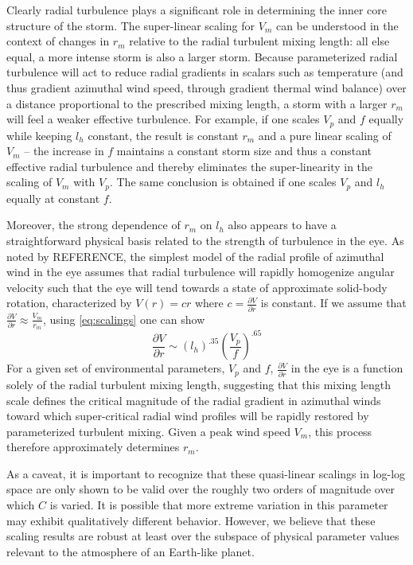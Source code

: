 \documentclass[12pt]{article}
\begin{document}
Clearly radial turbulence plays a significant role in determining the inner core structure of the storm. The super-linear scaling for $V_m$ can be understood in the context of changes in $r_m$ relative to the radial turbulent mixing length: all else equal, a more intense storm is also a larger storm. Because parameterized radial turbulence will act to reduce radial gradients in scalars such as temperature (and thus gradient azimuthal wind speed, through gradient thermal wind balance) over a distance proportional to the prescribed mixing length, a storm with a larger $r_m$ will feel a weaker effective turbulence.  For example, if one scales $V_p$ and $f$ equally while keeping $l_h$ constant, the result is constant $r_m$ and a pure linear scaling of $V_m$ -- the increase in $f$ maintains a constant storm size and thus a constant effective radial turbulence and thereby eliminates the super-linearity in the scaling of $V_m$ with $V_p$.  The same conclusion is obtained if one scales $V_p$ and $l_h$ equally at constant $f$.

Moreover, the strong dependence of $r_m$ on $l_h$ also appears to have a straightforward physical basis related to the strength of turbulence in the eye.  As noted by REFERENCE, the simplest model of the radial profile of azimuthal wind in the eye assumes that radial turbulence will rapidly homogenize angular velocity such that the eye will tend towards a state of approximate solid-body rotation, characterized by $V(r) = cr$ where $c=\frac{\partial V}{\partial r}$ is constant. If we assume that $\frac{\partial V}{\partial r} \approx \frac{V_m}{r_m}$, using \eqref{eq:scalings} one can show
\begin{equation}
\label{eq:eye}
\frac{\partial V}{\partial r} \sim \left(l_h\right)^{.35}\left(\frac{V_p}{f}\right)^{.65}
\end{equation}
For a given set of environmental parameters, $V_p$ and $f$, $\frac{\partial V}{\partial r}$ in the eye is a function solely of the radial turbulent mixing length, suggesting that this mixing length scale defines the critical magnitude of the radial gradient in azimuthal winds toward which super-critical radial wind profiles will be rapidly restored by parameterized turbulent mixing. Given a peak wind speed $V_m$, this process therefore approximately determines $r_m$.

As a caveat, it is important to recognize that these quasi-linear scalings in log-log space are only shown to be valid over the roughly two orders of magnitude over which $C$ is varied. It is possible that more extreme variation in this parameter may exhibit qualitatively different behavior.  However, we believe that these scaling results are robust at least over the subspace of physical parameter values relevant to the atmosphere of an Earth-like planet.
\end{document}
